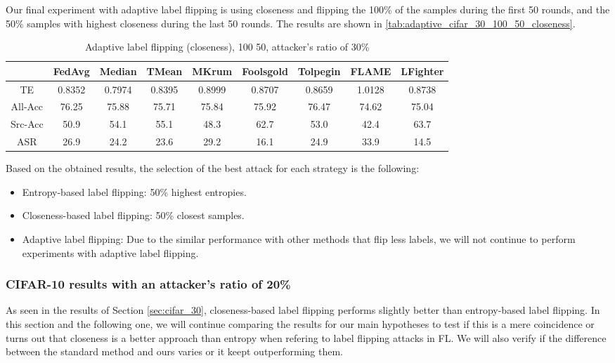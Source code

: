 Our final experiment with adaptive label flipping is using closeness and flipping the 100\% of the samples during the first 50 rounds, and the 50\% samples with highest closeness during the last 50 rounds. The results are shown in \autoref{tab:adaptive_cifar_30_100_50_closeness}.
\begin{table}[h!]
        \centering
        \small
        \begin{adjustbox}{center}
        \begin{tabular}{|c|c|c|c|c|c|c|c|c|}
            \hline
            & FedAvg & Median & TMean & MKrum & Foolsgold & Tolpegin & FLAME & LFighter \\
            \hline
            TE & 0.8352 & 0.7974 & 0.8395 & 0.8999 & 0.8707 & 0.8659 & 1.0128 & 0.8738 \\
            \hline
            All-Acc & 76.25 & 75.88 & 75.71 & 75.84 & 75.92 & 76.47 & 74.62 & 75.04 \\
            \hline
            Src-Acc & 50.9 & 54.1 & 55.1 & 48.3 & 62.7 & 53.0 & 42.4 & 63.7 \\
            \hline
            ASR & 26.9 & 24.2 & 23.6 & 29.2 & 16.1 & 24.9 & 33.9 & 14.5 \\
            \hline
        \end{tabular}
        \end{adjustbox}
        \caption{Adaptive label flipping (closeness), 100 50, attacker's ratio of 30\%}
        \label{tab:adaptive_cifar_30_100_50_closeness}
    \end{table}

Based on the obtained results, the selection of the best attack for each strategy is the following:
\begin{itemize}
        \item Entropy-based label flipping: 50\% highest entropies.
        \item Closeness-based label flipping: 50\% closest samples.
        \item Adaptive label flipping: Due to the similar performance with other methods that flip less labels, we will not continue to perform experiments with adaptive label flipping.
\end{itemize}
\subsubsection{CIFAR-10 results with an attacker's ratio of 20\%}
As seen in the results of Section \ref{sec:cifar_30}, closeness-based label flipping performs slightly better than entropy-based label flipping. In this section and the following one, we will continue comparing the results for our main hypotheses to test if this is a mere coincidence or turns out that closeness is a better approach than entropy when refering to label flipping attacks in FL.
We will also verify if the difference between the standard method and ours varies or it keept outperforming them.

